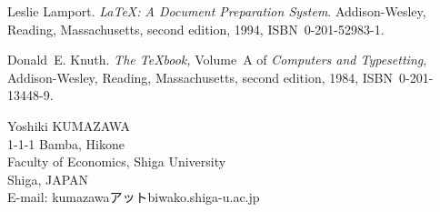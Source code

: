 \documentclass[a4paper,twocolumn]{jsarticle}
\begin{document}
\hangindent=20pt %
Leslie Lamport.  \newblock \emph{{\LaTeX:} A Document
    Preparation System}.  \newblock Addison-Wesley, Reading,
  Massachusetts, second edition, 1994, ISBN~0-201-52983-1.
  
\hangindent=20pt %
Donald~E. Knuth.  \newblock \textit{The \TeX{}book,}
  Volume~A of \textit{Computers and Typesetting}, Addison-Wesley,
  Reading, Massachusetts, second edition, 1984, ISBN~0-201-13448-9.

\endgroup

\begin{center}
Yoshiki KUMAZAWA \\
1-1-1 Bamba, Hikone\\
Faculty of Economics,  Shiga University\\
Shiga, JAPAN\\
E-mail: kumazawaアットbiwako.shiga-u.ac.jp
\end{center}
\end{document}
